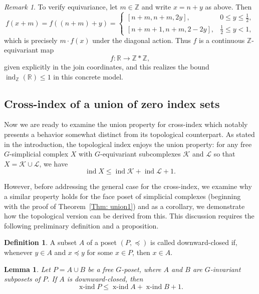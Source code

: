 \documentclass[preprint,12pt]{article}
\renewcommand{\le}{\leqslant}
\newtheorem{lemma}[theorem]{Lemma}
\theoremstyle{definition}
\newtheorem{definition}[theorem]{Definition}
\theoremstyle{remark}
\newtheorem{remark}[theorem]{Remark}
\numberwithin{equation}{section}
\DeclareMathOperator{\ind}{ind}
\DeclareMathOperator{\xind}{x-ind}
\begin{document}
\begin{remark}
To verify equivariance, let $m \in \mathbb{Z}$ and write $x = n + y$ as above. Then
\[
f(x+m) = f((n+m)+y) =
\begin{cases}
[n+m, n+m, 2y], & 0 \le y \le \frac{1}{2},\\[4pt]
[n+m+1, n+m, 2 - 2y], & \frac{1}{2} \le y < 1,
\end{cases}
\]
which is precisely $m \cdot f(x)$ under the diagonal action. Thus $f$ is a continuous $\mathbb{Z}$-equivariant map
\[
f \colon \mathbb{R} \to \mathbb{Z} * \mathbb{Z},
\]
given explicitly in the join coordinates, and this realizes the bound $\ind_{\mathbb{Z}}(\mathbb{R}) \le 1$ in this concrete model.
\end{remark}


\subsection{Cross-index of a union of zero index sets}

\label{subsection: union}
Now we are ready to examine the union property for cross-index which notably presents a behavior somewhat distinct from its topological counterpart. As stated in the introduction, the topological index enjoys the union property: for any free $G$-simplicial complex $X$ with $G$-equivariant subcomplexes $\mathcal{K}$ and $\mathcal{L}$ so that $X = \mathcal{K} \cup \mathcal{L}$, we have
\[
\ind X \le \ind \mathcal{K} + \ind \mathcal{L} + 1.
\]

However, before addressing the general case for the cross-index, we examine why a similar property holds for the face poset of simplicial complexes (beginning with the proof of Theorem~\ref{Thm: union1}) and as a corollary, we demonstrate how the topological version can be derived from this. This discussion requires the following preliminary definition and a proposition.


\begin{definition}
A subset $A$ of a poset $(P, \preceq)$ is called downward-closed if, whenever $y \in A$ and $x \preceq y$ for some $x \in P$, then $x \in A$.
\end{definition}

\begin{lemma}
\label{lem: downward-closed poset}
 Let $P=A\cup B$ be a free \(G\)-poset, where \(A\) and \(B\) are \(G\)-invariant subposets of $P$. If $A$ is downward-closed, then
\[
\xind P\le \xind A + \xind B + 1.
\]   
\end{lemma}
\end{document}
